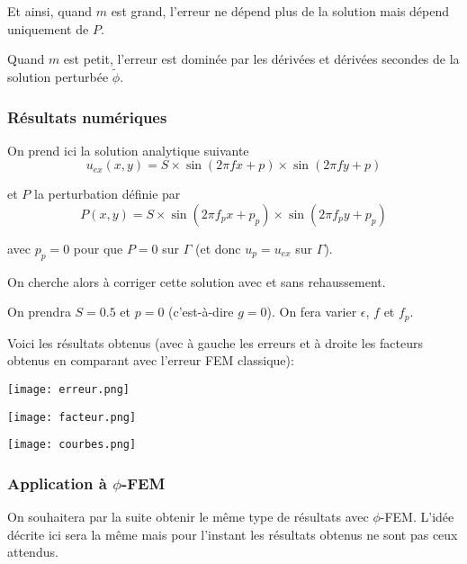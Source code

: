 Et ainsi, quand $m$ est grand, l'erreur ne dépend plus de la solution mais dépend uniquement de $P$.

Quand $m$ est petit, l'erreur est dominée par les dérivées et dérivées secondes de la solution perturbée $\tilde{\phi}$.

\subsubsection*{Résultats numériques}

On prend ici la solution analytique suivante
$$u_{ex}(x,y) = S\times\sin(2\pi fx + p)\times\sin(2\pi fy + p)$$ 

et $P$ la perturbation définie par
$$P(x,y)=S\times\sin(2\pi f_px + p_p)\times\sin(2\pi f_py + p_p)$$

avec $p_p=0$ pour que $P=0$ sur $\Gamma$ (et donc $u_p=u_{ex}$ sur $\Gamma$). 

On cherche alors à corriger cette solution avec et sans rehaussement.

On prendra $S=0.5$ et $p=0$ (c'est-à-dire $g=0$). On fera varier $\epsilon$, $f$ et $f_p$. 

\newpage

Voici les résultats obtenus (avec à gauche les erreurs et à droite les facteurs obtenus en comparant avec l'erreur FEM classique):

\begin{minipage}{0.48\linewidth}
	\centering
	\texttt{[image: erreur.png]}
\end{minipage}
\begin{minipage}{0.48\linewidth}
	\centering
	\texttt{[image: facteur.png]}
\end{minipage}

\begin{minipage}{\linewidth}
	\centering
	\texttt{[image: courbes.png]}
\end{minipage}

\subsubsection*{Application à $\phi$-FEM}

On souhaitera par la suite obtenir le même type de résultats avec $\phi$-FEM. L'idée décrite ici sera la même mais pour l'instant les résultats obtenus ne sont pas ceux attendus.